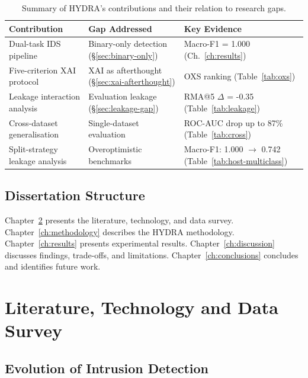 \documentclass[12pt,a4paper]{report}
\begin{document}
\begin{table}[H]
\caption{Summary of HYDRA's contributions and their relation to research gaps.}
\label{tab:contributions}
\centering
\begin{tabular}{p{}p{}p{}}
\toprule
\textbf{Contribution} & \textbf{Gap Addressed} & \textbf{Key Evidence} \\
\midrule
Dual-task IDS pipeline & Binary-only detection (\S\ref{sec:binary-only}) & Macro-F1 = 1.000 (Ch.~\ref{ch:results}) \\
Five-criterion XAI protocol & XAI as afterthought (\S\ref{sec:xai-afterthought}) & OXS ranking (Table~\ref{tab:oxs}) \\
Leakage interaction analysis & Evaluation leakage (\S\ref{sec:leakage-gap}) & RMA@5 $\Delta$ = -0.35 (Table~\ref{tab:leakage}) \\
Cross-dataset generalisation & Single-dataset evaluation & ROC-AUC drop up to 87\% (Table~\ref{tab:cross}) \\
Split-strategy leakage analysis & Overoptimistic benchmarks & Macro-F1: 1.000 $\to$ 0.742 (Table~\ref{tab:host-multiclass}) \\
\bottomrule
\end{tabular}
\end{table}

\section{Dissertation Structure}
\label{sec:structure}

Chapter~\ref{ch:literature} presents the literature, technology, and data survey. Chapter~\ref{ch:methodology} describes the HYDRA methodology. Chapter~\ref{ch:results} presents experimental results. Chapter~\ref{ch:discussion} discusses findings, trade-offs, and limitations. Chapter~\ref{ch:conclusions} concludes and identifies future work.

\chapter{Literature, Technology and Data Survey}
\label{ch:literature}

\section{Evolution of Intrusion Detection}
\label{sec:evolution}
\end{document}
